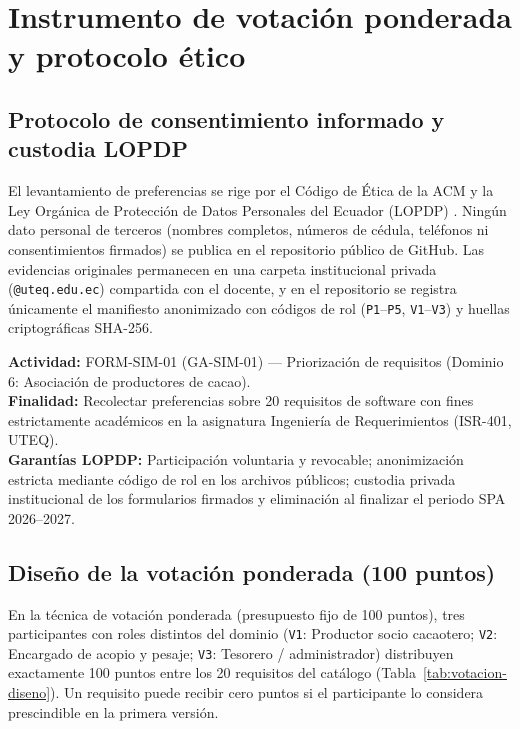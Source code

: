 \section{Instrumento de votaci\'on ponderada y protocolo \'etico}
\label{sec:votacion-etica}

\subsection{Protocolo de consentimiento informado y custodia LOPDP}

El levantamiento de preferencias se rige por el C\'odigo de \'Etica de la ACM \cite{acm2018} y la Ley Org\'anica de Protecci\'on de Datos Personales del Ecuador (LOPDP) \cite{lopdp2021}. Ning\'un dato personal de terceros (nombres completos, n\'umeros de c\'edula, tel\'efonos ni consentimientos firmados) se publica en el repositorio p\'ublico de GitHub. Las evidencias originales permanecen en una carpeta institucional privada (\texttt{@uteq.edu.ec}) compartida con el docente, y en el repositorio se registra \'unicamente el manifiesto anonimizado con c\'odigos de rol (\texttt{P1}--\texttt{P5}, \texttt{V1}--\texttt{V3}) y huellas criptogr\'aficas SHA-256.

\begin{tcolorbox}[colback=boxbg,colframe=uteqgreen,boxrule=0.8pt,arc=2mm,title={\textbf{Extracto del formato de consentimiento informado --- FORM-SIM-01}}]
\textbf{Actividad:} FORM-SIM-01 (GA-SIM-01) --- Priorizaci\'on de requisitos (Dominio 6: Asociaci\'on de productores de cacao).\\
\textbf{Finalidad:} Recolectar preferencias sobre 20 requisitos de software con fines estrictamente acad\'emicos en la asignatura Ingenier\'ia de Requerimientos (ISR-401, UTEQ).\\
\textbf{Garant\'ias LOPDP:} Participaci\'on voluntaria y revocable; anonimizaci\'on estricta mediante c\'odigo de rol en los archivos p\'ublicos; custodia privada institucional de los formularios firmados y eliminaci\'on al finalizar el periodo SPA 2026--2027.
\end{tcolorbox}

\subsection{Dise\~no de la votaci\'on ponderada (100 puntos)}

En la t\'ecnica de votaci\'on ponderada (presupuesto fijo de 100 puntos), tres participantes con roles distintos del dominio (\texttt{V1}: Productor socio cacaotero; \texttt{V2}: Encargado de acopio y pesaje; \texttt{V3}: Tesorero / administrador) distribuyen exactamente 100 puntos entre los 20 requisitos del cat\'alogo (Tabla~\ref{tab:votacion-diseno}). Un requisito puede recibir cero puntos si el participante lo considera prescindible en la primera versi\'on.

